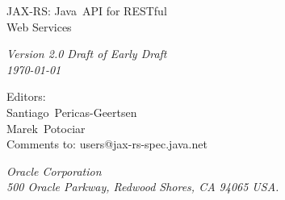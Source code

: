 \begin{titlepage}
\raggedleft

\vspace*{60pt}

{\Huge
\textsf{JAX-RS: Java\texttrademark\ API for RESTful\\\vspace{10pt}
 Web Services}}

\vspace{20pt}

{
\Large\textit{Version 2.0 Draft of Early Draft\\
\today}
}

\vspace{40pt}

{\large Editors:\\
Santiago\ Pericas-Geertsen\\
Marek\ Potociar\\
\vspace{10pt}Comments to: users@jax-rs-spec.java.net
}

\vspace{80pt}

{\small\textit{Oracle Corporation\\
500 Oracle Parkway, Redwood Shores, CA 94065 USA.}
}
\end{titlepage} 
